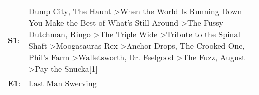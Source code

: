 \begin{supertabular}{p{0.03\textwidth}p{0.92\textwidth}}
 \textbf{S1}:  &  Dump City\textsuperscript{}, \enspace The Haunt\textsuperscript{} \textgreater \enspace When the World Is Running Down You Make the Best of What's Still Around\textsuperscript{} \textgreater \enspace The Fussy Dutchman\textsuperscript{}, \enspace Ringo\textsuperscript{} \textgreater \enspace The Triple Wide\textsuperscript{} \textgreater \enspace Tribute to the Spinal Shaft\textsuperscript{} \textgreater \enspace Moogasauras Rex\textsuperscript{} \textgreater \enspace Anchor Drops\textsuperscript{}, \enspace The Crooked One\textsuperscript{}, \enspace Phil's Farm\textsuperscript{} \textgreater \enspace Walletsworth\textsuperscript{}, \enspace Dr. Feelgood\textsuperscript{} \textgreater \enspace The Fuzz\textsuperscript{}, \enspace August\textsuperscript{} \textgreater \enspace Pay the Snucka[1]\textsuperscript{}  \enspace  \\
 \textbf{E1}:  &                                                                                                                                                                                                                                                                                                                                                                                                                                                                                                                                                                                                                                                                                                                                                                                                                      Last Man Swerving\textsuperscript{}  \enspace  \\
\end{supertabular}

